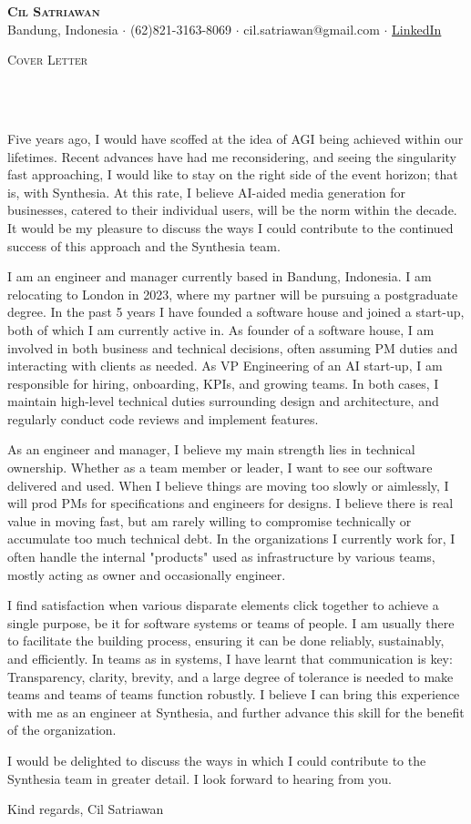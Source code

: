 \documentclass[11pt]{article}
\newcommand{\lineunder} {
    \vspace*{-8pt} \\
    \hspace*{-10pt} \hrulefill \\
}
\newcommand{\header} [1] {
    \begin{center}
      {\large \scshape {#1}}
      \lineunder
    \end{center}
    \vspace*{-8pt}
}
\newcommand{\profile} [5] {
    \vspace*{-15pt}
    \begin{center}
        {\huge \scshape \textbf{#1}}\\
        \vspace{1mm}
        \small {#2} $\cdot$ {#3} $\cdot$ {#4} $\cdot$ {#5}
    \end{center}
    \vspace*{-8pt}
}
\begin{document}
\vspace*{-40pt}

\profile{Cil Satriawan}{Bandung, Indonesia}{(62)821-3163-8069}
{cil.satriawan@gmail.com}{\href{https://www.linkedin.com/in/cil-satriawan-a60601111}{LinkedIn}}

\header{Cover Letter}
\vspace{1mm}

Five years ago, I would have scoffed at the idea of AGI being achieved within
our lifetimes. Recent advances have had me reconsidering, and seeing the
singularity fast approaching, I would like to stay on the right side of the
event horizon; that is, with Synthesia. At this rate, I believe AI-aided media
generation for businesses, catered to their individual users, will be the norm
within the decade. It would be my pleasure to discuss the ways I could
contribute to the continued success of this approach and the Synthesia team.
\vspace{3mm}

I am an engineer and manager currently based in Bandung, Indonesia. I am
relocating to London in 2023, where my partner will be pursuing a postgraduate
degree. In the past 5 years I have founded a software house and joined a
start-up, both of which I am currently active in. As founder of a software
house, I am involved in both business and technical decisions, often assuming
PM duties and interacting with clients as needed. As VP Engineering of an AI
start-up, I am responsible for hiring, onboarding, KPIs, and growing teams. In
both cases, I maintain high-level technical duties surrounding design and
architecture, and regularly conduct code reviews and implement features.
\vspace{3mm}

As an engineer and manager, I believe my main strength lies in technical
ownership. Whether as a team member or leader, I want to see our software
delivered and used. When I believe things are moving too slowly or aimlessly, I
will prod PMs for specifications and engineers for designs. I believe there is
real value in moving fast, but am rarely willing to compromise technically or
accumulate too much technical debt. In the organizations I currently work for, I
often handle the internal "products" used as infrastructure by various teams,
mostly acting as owner and occasionally engineer.
\vspace{3mm}

I find satisfaction when various disparate elements click together to achieve a
single purpose, be it for software systems or teams of people. I am usually
there to facilitate the building process, ensuring it can be done reliably,
sustainably, and efficiently. In teams as in systems, I have learnt that
communication is key: Transparency, clarity, brevity, and a large degree of
tolerance is needed to make teams and teams of teams function robustly. I
believe I can bring this experience with me as an engineer at Synthesia, and
further advance this skill for the benefit of the organization.
\vspace{3mm}

I would be delighted to discuss the ways in which I could contribute to the
Synthesia team in greater detail. I look forward to hearing from you.
\vspace{3mm}

Kind regards,\newline
Cil Satriawan

\ 
\end{document}
